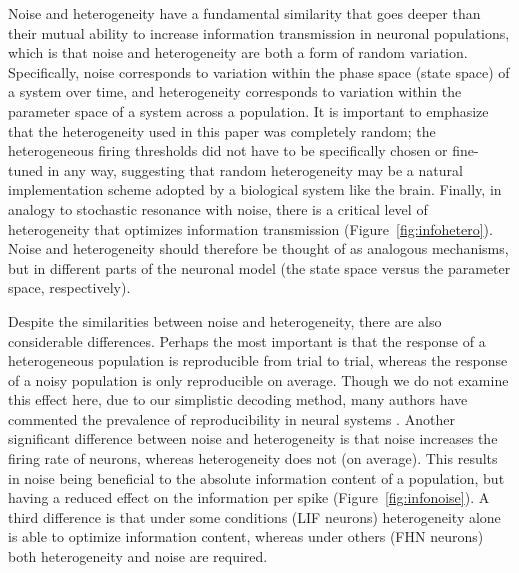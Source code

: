 \documentclass[letterpaper,11pt]{article}
\begin{document}
Noise and heterogeneity have a fundamental similarity that goes deeper than their mutual ability to increase information transmission in neuronal populations, which is that noise and heterogeneity are both a form of random variation. Specifically, noise corresponds to variation within the phase space (state space) of a system over time, and heterogeneity corresponds to variation within the parameter space of a system across a population. It is important to emphasize that the heterogeneity used in this paper was completely random; the heterogeneous firing thresholds did not have to be specifically chosen or fine-tuned in any way, suggesting that random heterogeneity may be a natural implementation scheme adopted by a biological system like the brain. Finally, in analogy to stochastic resonance with noise, there is a critical level of heterogeneity that optimizes information transmission (Figure~\ref{fig:infohetero}). Noise and heterogeneity should therefore be thought of as analogous mechanisms, but in different parts of the neuronal model (the state space versus the parameter space, respectively).

Despite the similarities between noise and heterogeneity, there are also considerable differences.
Perhaps the most important is that the response of a heterogeneous population is reproducible from trial to trial, whereas the response of a noisy population is only reproducible on average.
Though we do not examine this effect here, due to our simplistic decoding method,
many authors have commented the prevalence of reproducibility in neural systems \citep[e.g.,][]{Mainen1995}.
Another significant difference between noise and heterogeneity is that noise increases the firing rate of neurons, whereas heterogeneity does not (on average). This results in noise being beneficial to the absolute information content of a population, but having a reduced effect on the information per spike (Figure~\ref{fig:infonoise}).
A third difference is that under some conditions (LIF neurons) heterogeneity alone is able to optimize information content, whereas under others (FHN neurons) both heterogeneity and noise are required.
\end{document}

